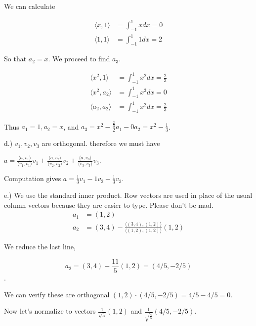 \documentclass{article}
\begin{document}
We can calculate 

\begin{align*}
\langle x,1\rangle &= \int_{-1}^1 xdx = 0\\
\langle 1,1\rangle &= \int_{-1}^1 1dx = 2
\end{align*}

So that $a_2=x$. We proceed to find $a_3$.

\begin{align*}
\langle x^2,1\rangle &=\int_{-1}^1 x^2dx = \frac{2}{3}\\
\langle x^2,a_2\rangle &=\int_{-1}^1 x^3dx = 0\\
\langle a_2,a_2\rangle &=\int_{-1}^1 x^2dx = \frac{2}{3}
\end{align*}

Thus $a_1 = 1, a_2 =x$, and $a_3=x^2 - \frac{\frac{2}{3}}{2}a_1-0a_2 = x^2 - \frac{1}{3}$.


d.) $v_1, v_2,v_3$ are orthogonal. therefore we must have 

$a = \frac{\langle a,v_1\rangle}{\langle v_1,v_1\rangle}v_1+\frac{\langle a,v_2\rangle}{\langle v_2,v_2\rangle}v_2 + \frac{\langle a,v_3\rangle}{\langle v_3,v_3\rangle}v_3$. 

Computation gives $a = \frac{1}{3}v_1 -1v_2 -\frac{1}{3}v_3.$

e.) We use the standard inner product. Row vectors are used in place of the usual column vectors because they are easier to type. Please don't be mad.
\begin{align*}
a_1 &= (1,2) \\
a_2 &= (3,4) - \frac{\langle (3,4),(1,2)\rangle}{\langle (1,2), (1,2)\rangle}(1,2)
\end{align*}

We reduce the last line,

$$a_2 = (3,4) - \frac{11}{5}(1,2) = (4/5, -2/5)$$. 

We can verify these are orthogonal $(1,2)\cdot (4/5,-2/5) = 4/5-4/5=0$. 

Now let's normalize to vectors $\frac{1}{\sqrt{5}}(1,2)$ and $\frac{1}{\sqrt{\frac{4}{5}}}(4/5,-2/5)$.
\end{document}
